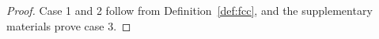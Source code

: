 \documentclass{article}
\begin{document}
\begin{proof}
  Case 1 and 2 follow from Definition~\ref{def:fcc}, and the
  supplementary materials prove case 3.



\end{proof}
\end{document}
